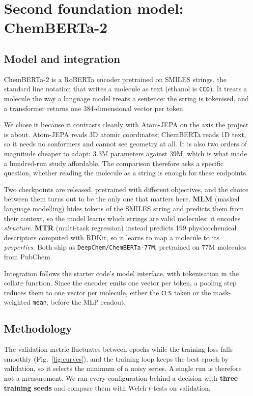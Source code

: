 \documentclass[10pt,twocolumn,a4paper]{article}
\begin{document}
\section{Second foundation model: ChemBERTa-2}

\subsection{Model and integration}

ChemBERTa-2 is a RoBERTa encoder pretrained on SMILES strings, the
standard line notation that writes a molecule as text (ethanol is
\texttt{CCO}). It treats a molecule the way a language model treats a
sentence: the string is tokenised, and a transformer returns one
384-dimensional vector per token.

We chose it because it contrasts cleanly with Atom-JEPA on the axis the
project is about. Atom-JEPA reads 3D atomic coordinates; ChemBERTa
reads 1D text, so it needs no conformers and cannot see geometry at
all. It is also two orders of magnitude cheaper to adapt: 3.3M
parameters against 39M, which is what made a hundred-run study
affordable. The comparison therefore asks a specific question, whether
reading the molecule as a string is enough for these endpoints.

Two checkpoints are released, pretrained with different objectives, and
the choice between them turns out to be the only one that matters here.
\textbf{MLM} (masked language modelling) hides tokens of the SMILES
string and predicts them from their context, so the model learns which
strings are valid molecules: it encodes \emph{structure}. \textbf{MTR}
(multi-task regression) instead predicts 199 physicochemical
descriptors computed with RDKit, so it learns to map a molecule to its
\emph{properties}. Both ship as \texttt{DeepChem/ChemBERTa-77M},
pretrained on 77M molecules from PubChem.

Integration follows the starter code's model interface, with
tokenisation in the collate function. Since the encoder emits one
vector per token, a pooling step reduces them to one vector per
molecule, either the \texttt{CLS} token or the mask-weighted
\texttt{mean}, before the MLP readout.

\subsection{Methodology}

The validation metric fluctuates between epochs while the training loss
falls smoothly (Fig.~\ref{fig:curves}), and the training loop keeps the
best epoch by validation, so it selects the minimum of a noisy series.
A single run is therefore not a measurement. We ran every configuration
behind a decision with \textbf{three training seeds} and compare them
with Welch $t$-tests on validation.
\end{document}
